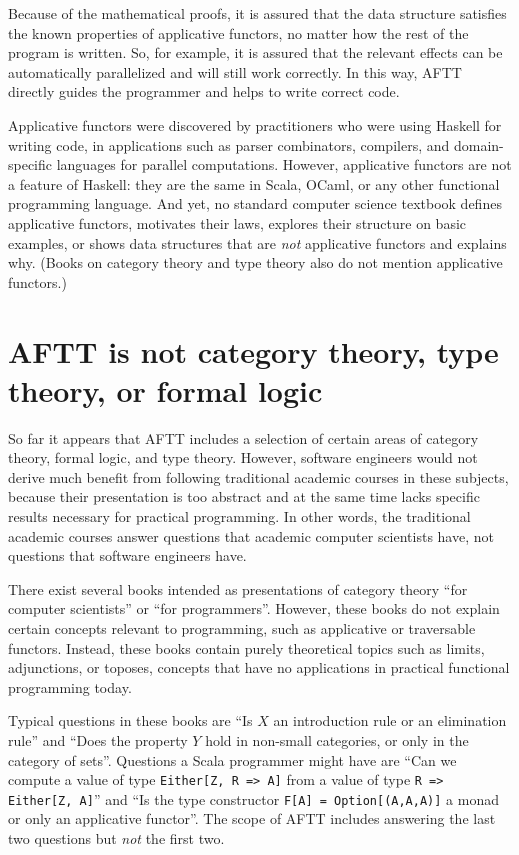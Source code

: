 Because of the mathematical proofs, it is assured that the data structure
satisfies the known properties of applicative functors, no matter
how the rest of the program is written. So, for example, it is assured
that the relevant effects can be automatically parallelized and will
still work correctly. In this way, AFTT directly guides the programmer
and helps to write correct code.

Applicative functors were discovered by practitioners who were using
Haskell for writing code, in applications such as parser combinators,
compilers, and domain-specific languages for parallel computations.
However, applicative functors are not a feature of Haskell: they are
the same in Scala, OCaml, or any other functional programming language.
And yet, no standard computer science textbook defines applicative
functors, motivates their laws, explores their structure on basic
examples, or shows data structures that are \emph{not} applicative
functors and explains why. (Books on category theory and type theory
also do not mention applicative functors.)

\section{AFTT is not category theory, type theory, or formal logic}

So far it appears that AFTT includes a selection of certain areas
of category theory, formal logic, and type theory. However, software
engineers would not derive much benefit from following traditional
academic courses in these subjects, because their presentation is
too abstract and at the same time lacks specific results necessary
for practical programming. In other words, the traditional academic
courses answer questions that academic computer scientists have, not
questions that software engineers have.

There exist several books intended as presentations of category theory
``for computer scientists'' or ``for programmers''. However, these
books do not explain certain concepts relevant to programming, such
as applicative or traversable functors. Instead, these books contain
purely theoretical topics such as limits, adjunctions, or toposes,
\textendash{} concepts that have no applications in practical functional
programming today.

Typical questions in these books are ``Is $X$ an introduction rule
or an elimination rule'' and ``Does the property $Y$ hold in non-small
categories, or only in the category of sets''. Questions a Scala
programmer might have are ``Can we compute a value of type \lstinline!Either[Z, R => A]!
from a value of type \lstinline!R => Either[Z, A]!'' and ``Is the
type constructor \lstinline!F[A] = Option[(A,A,A)]! a monad or only
an applicative functor''. The scope of AFTT includes answering the
last two questions but \emph{not} the first two.

